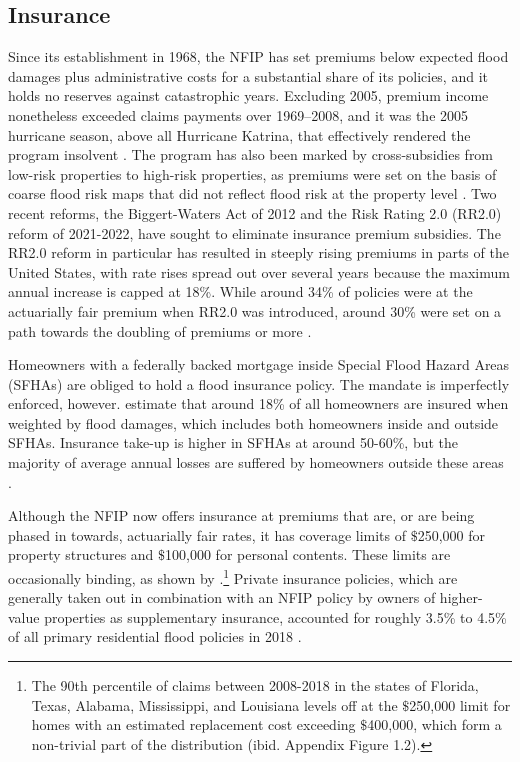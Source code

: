 \documentclass[12pt]{article}
\begin{document}
\subsection{Insurance}\label{subsec:insurance}
Since its establishment in 1968, the NFIP has set premiums below expected flood damages plus administrative costs for a substantial share of its policies, and it holds no reserves against catastrophic years. Excluding 2005, premium income nonetheless exceeded claims payments over 1969--2008, and it was the 2005 hurricane season, above all Hurricane Katrina, that effectively rendered the program insolvent \citep{michel2010catastrophe}. The program has also been marked by cross-subsidies from low-risk properties to high-risk properties, as premiums were set on the basis of coarse flood risk maps that did not reflect flood risk at the property level \citep{kousky2018financing}. Two recent reforms, the Biggert-Waters Act of 2012 and the Risk Rating 2.0 (RR2.0) reform of 2021-2022, have sought to eliminate insurance premium subsidies. The RR2.0 reform in particular has resulted in steeply rising premiums in parts of the United States, with rate rises spread out over several years because the maximum annual increase is capped at 18\%. While around 34\% of policies were at the actuarially fair premium when RR2.0 was introduced, around 30\% were set on a path towards the doubling of premiums or more \citep[p.~25]{gao2023flood}.  

Homeowners with a federally backed mortgage inside Special Flood Hazard Areas (SFHAs) are obliged to hold a flood insurance policy. The mandate is imperfectly enforced, however. \cite{gruber2026optimal} estimate that around 18\% of all homeowners are insured when weighted by flood damages, which includes both homeowners inside and outside SFHAs. Insurance take-up is higher in SFHAs at around 50-60\%, but the majority of average annual losses are suffered by homeowners outside these areas \citep{amornsiripanitch2025measuring}.

Although the NFIP now offers insurance at premiums that are, or are being phased in towards, actuarially fair rates, it has coverage limits of $\$$250,000 for property structures and $\$$100,000 for personal contents. These limits are occasionally binding, as shown by \cite{sastry2026bears}.\footnote{The 90th percentile of claims between 2008-2018 in the states of Florida, Texas, Alabama, Mississippi, and Louisiana  levels off at the $\$$250,000 limit for homes with an estimated replacement cost exceeding $\$$400,000, which form a non-trivial part of the distribution (ibid. Appendix Figure 1.2).} Private insurance policies, which are generally taken out in combination with an NFIP policy by owners of higher-value properties as supplementary insurance, accounted for roughly 3.5\% to 4.5\% of all primary residential flood policies in 2018 \citep{kousky2018emerging}.
\end{document}
